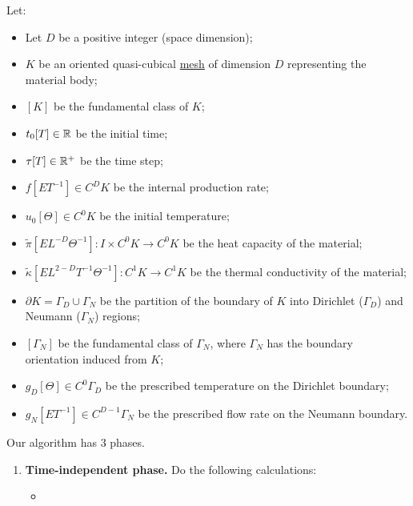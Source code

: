 \begin{algorithm}
  \label{cmc/diffusion/discrete/transient/primal_weak_solve_trapezoidal-algorithm}
  Let:
  \begin{itemize}
    \item
      Let $D$ be a positive integer (space dimension);
    \item
      $K$ be an oriented quasi-cubical \hyperref[cmc:mesh:definition]{mesh} of
      dimension $D$ representing the material body;
    \item
      $[K]$ be the fundamental class of $K$;
    \item
      $t_0 [T] \in \mathbb{R}$ be the initial time;
    \item
      $\tau [T] \in \mathbb{R}^+$ be the time step;
    \item
      $f [E T^{-1}] \in C^D K$ be the internal production rate;
    \item
      $u_0 [\Theta] \in C^0 K$ be the initial temperature;
    \item
      $\tilde{\pi} [E L^{-D} \Theta^{-1}] \colon I \times C^0 K \to C^0 K$
      be the heat capacity of the material;
    \item
      $\tilde{\kappa} [E L^{2 - D} T^{-1} \Theta^{-1}] \colon C^1 K \to C^1 K$
      be the thermal conductivity of the material;
    \item
      $\partial K = \Gamma_D \cup \Gamma_N$ be the partition of the boundary of
      $K$ into Dirichlet ($\Gamma_D$) and Neumann ($\Gamma_N$) regions;
    \item
      $[\Gamma_N]$ be the fundamental class of $\Gamma_N$, where $\Gamma_N$
      has the boundary orientation induced from $K$;
    \item
      $g_D [\Theta] \in C^0 \Gamma_D$
      be the prescribed temperature on the Dirichlet boundary;
    \item
      $g_N [E T^{-1}] \in C^{D - 1} \Gamma_N$
      be the prescribed flow rate on the Neumann boundary.
  \end{itemize}
  Our algorithm has $3$ phases.
  \begin{enumerate}
    \item
      \textbf{Time-independent phase.}
      Do the following calculations:
      \begin{itemize}
        \item

\end{itemize}
\end{enumerate}
\end{algorithm}
